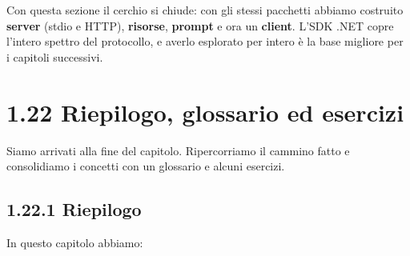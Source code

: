 \documentclass[
  italian,
  10pt,
]{book}
\begin{document}
Con questa sezione il cerchio si chiude: con gli stessi pacchetti
abbiamo costruito \textbf{server} (stdio e HTTP), \textbf{risorse},
\textbf{prompt} e ora un \textbf{client}. L'SDK .NET copre l'intero
spettro del protocollo, e averlo esplorato per intero è la base migliore
per i capitoli successivi.

\section{1.22 Riepilogo, glossario ed
esercizi}\label{riepilogo-glossario-ed-esercizi}

Siamo arrivati alla fine del capitolo. Ripercorriamo il cammino fatto e
consolidiamo i concetti con un glossario e alcuni esercizi.

\subsection{1.22.1 Riepilogo}\label{riepilogo}

In questo capitolo abbiamo:
\end{document}
